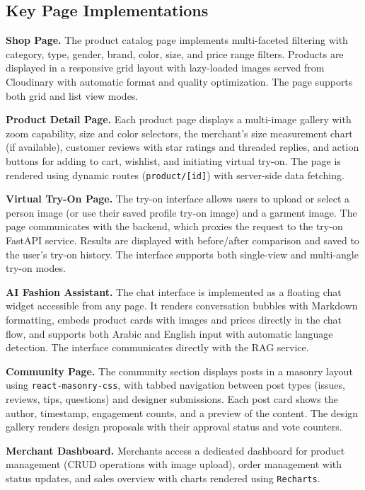 \subsection{Key Page Implementations}

\textbf{Shop Page.} The product catalog page implements multi-faceted filtering with category, type, gender, brand, color, size, and price range filters. Products are displayed in a responsive grid layout with lazy-loaded images served from Cloudinary with automatic format and quality optimization. The page supports both grid and list view modes.

\textbf{Product Detail Page.} Each product page displays a multi-image gallery with zoom capability, size and color selectors, the merchant's size measurement chart (if available), customer reviews with star ratings and threaded replies, and action buttons for adding to cart, wishlist, and initiating virtual try-on. The page is rendered using dynamic routes (\texttt{product/[id]}) with server-side data fetching.

\textbf{Virtual Try-On Page.} The try-on interface allows users to upload or select a person image (or use their saved profile try-on image) and a garment image. The page communicates with the backend, which proxies the request to the try-on FastAPI service. Results are displayed with before/after comparison and saved to the user's try-on history. The interface supports both single-view and multi-angle try-on modes.

\textbf{AI Fashion Assistant.} The chat interface is implemented as a floating chat widget accessible from any page. It renders conversation bubbles with Markdown formatting, embeds product cards with images and prices directly in the chat flow, and supports both Arabic and English input with automatic language detection. The interface communicates directly with the RAG service.

\textbf{Community Page.} The community section displays posts in a masonry layout using \texttt{react-masonry-css}, with tabbed navigation between post types (issues, reviews, tips, questions) and designer submissions. Each post card shows the author, timestamp, engagement counts, and a preview of the content. The design gallery renders design proposals with their approval status and vote counters.

\textbf{Merchant Dashboard.} Merchants access a dedicated dashboard for product management (CRUD operations with image upload), order management with status updates, and sales overview with charts rendered using \texttt{Recharts}.

